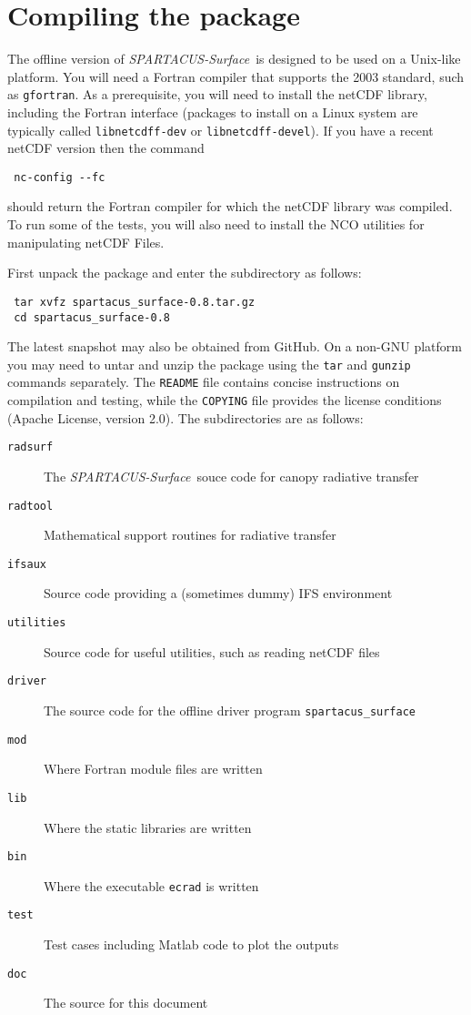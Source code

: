 \documentclass[a4,oneside]{article}
\def\codesize{\small}
\def\spsurf{\emph{SPARTACUS-Surface}}
\def\code#1{{\codesize\texttt{#1}}}
\def\citem#1{\item[{\codesize\texttt{#1}}]}
\def\chapter{\section}
\begin{document}

\section{Compiling the package}
\label{sec:compile}
The offline version of \spsurf\ is designed to be used on a Unix-like
platform. You will need a Fortran compiler that supports the 2003
standard, such as \code{gfortran}.
%
As a prerequisite, you will need to install the netCDF library,
including the Fortran interface (packages to install on a Linux system
are typically called \code{libnetcdff-dev} or
\code{libnetcdff-devel}).  If you have a recent netCDF version then
the command
\begin{lstlisting}
 nc-config --fc
\end{lstlisting}
should return the Fortran compiler for which the netCDF library was
compiled.  To run some of the tests, you will also need to install the
NCO utilities for manipulating netCDF Files.

First unpack the package and enter the subdirectory as follows:
\begin{lstlisting}
 tar xvfz spartacus_surface-0.8.tar.gz
 cd spartacus_surface-0.8
\end{lstlisting}
The latest snapshot may also be obtained from GitHub.  On a non-GNU
platform you may need to untar and unzip the package using the
\code{tar} and \code{gunzip} commands separately. The \code{README}
file contains concise instructions on compilation and testing, while
the \code{COPYING} file provides the license conditions (Apache
License, version 2.0). The subdirectories are as follows:
%
\begin{description}
\citem{radsurf} The \spsurf\ souce code for canopy radiative transfer
\citem{radtool} Mathematical support routines for radiative transfer
\citem{ifsaux} Source code providing a (sometimes dummy) IFS environment
\citem{utilities} Source code for useful utilities, such as reading netCDF
       files
\citem{driver} The source code for the offline driver program \code{spartacus\_surface}
\citem{mod} Where Fortran module files are written
\citem{lib} Where the static libraries are written
\citem{bin} Where the executable \code{ecrad} is written
\citem{test} Test cases including Matlab code to plot the outputs
\citem{doc} The source for this document
\end{description}
\end{document}
